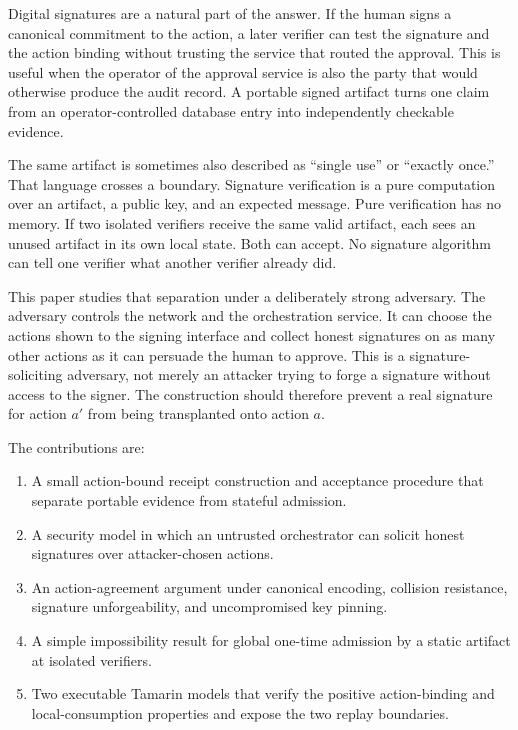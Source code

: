 \documentclass[10.5pt]{article}
\begin{document}
Digital signatures are a natural part of the answer. If the human signs a
canonical commitment to the action, a later verifier can test the signature and
the action binding without trusting the service that routed the approval. This is
useful when the operator of the approval service is also the party that would
otherwise produce the audit record. A portable signed artifact turns one claim
from an operator-controlled database entry into independently checkable evidence.

The same artifact is sometimes also described as ``single use'' or ``exactly
once.'' That language crosses a boundary. Signature verification is a pure
computation over an artifact, a public key, and an expected message. Pure
verification has no memory. If two isolated verifiers receive the same valid
artifact, each sees an unused artifact in its own local state. Both can accept.
No signature algorithm can tell one verifier what another verifier already did.

This paper studies that separation under a deliberately strong adversary. The
adversary controls the network and the orchestration service. It can choose the
actions shown to the signing interface and collect honest signatures on as many
other actions as it can persuade the human to approve. This is a
signature-soliciting adversary, not merely an attacker trying to forge a signature
without access to the signer. The construction should therefore prevent a real
signature for action $a'$ from being transplanted onto action $a$.

The contributions are:

\begin{enumerate}[leftmargin=*]
\item A small action-bound receipt construction and acceptance procedure that
separate portable evidence from stateful admission.
\item A security model in which an untrusted orchestrator can solicit honest
signatures over attacker-chosen actions.
\item An action-agreement argument under canonical encoding, collision resistance,
signature unforgeability, and uncompromised key pinning.
\item A simple impossibility result for global one-time admission by a static
artifact at isolated verifiers.
\item Two executable Tamarin models that verify the positive action-binding and
local-consumption properties and expose the two replay boundaries.
\end{enumerate}
\end{document}
